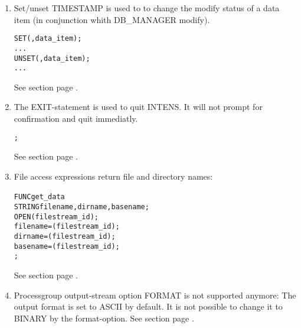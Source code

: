 \begin{enumerate}
\item Set/unset TIMESTAMP is used to to change the modify status of a data item (in conjunction whith DB\_MANAGER modify).

\begin{boxedminipage}[t]{\linewidth}
\begin{alltt}
  SET( \TIMESTAMP, data_item );
  ...
  UNSET( \TIMESTAMP, data_item );
  ...
\end{alltt}
\end{boxedminipage}

See section  page \pageref{fudatastatementset}. \\

\item The EXIT-statement is used to quit INTENS. It will not prompt for confirmation and quit immediatly. \\

\begin{boxedminipage}[t]{\linewidth}
\begin{alltt}
  \EXIT;
\end{alltt}
\end{boxedminipage}

See section  page \pageref{fuprintstatements}. \\

\item File access expressions return file and directory names:

\begin{boxedminipage}[t]{\linewidth}
\begin{alltt}
  FUNC get_data {
    STRING filename, dirname, basename;
    OPEN(filestream_id);
    filename = \FILENAME(filestream_id);
    dirname = \DIRNAME(filestream_id);
    basename = \BASENAME(filestream_id);
  };
\end{alltt}
\end{boxedminipage}

See section  page \pageref{fuexpressionsfunctions}. \\

\item Processgroup output-stream option FORMAT is not supported anymore:
The output format is set to ASCII by default. It is not possible to change it to BINARY by the format-option.
See section  page \pageref{opprocessgroupoutputstreamoption}. \\


\end{enumerate}


